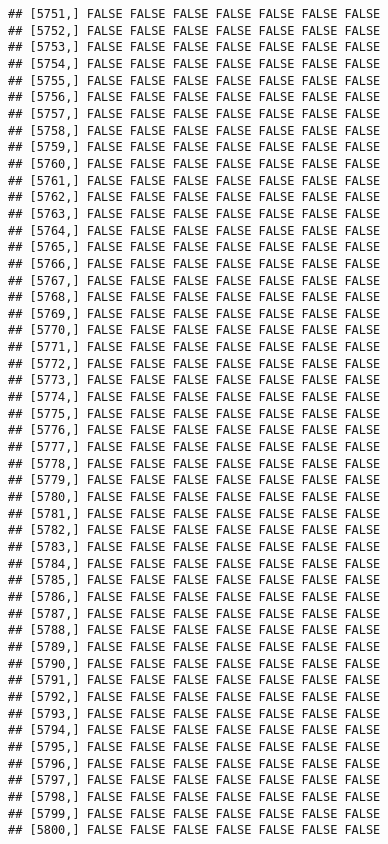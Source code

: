 \documentclass[
]{article}
\begin{document}
\begin{verbatim}
## [5751,] FALSE FALSE FALSE FALSE FALSE FALSE FALSE
## [5752,] FALSE FALSE FALSE FALSE FALSE FALSE FALSE
## [5753,] FALSE FALSE FALSE FALSE FALSE FALSE FALSE
## [5754,] FALSE FALSE FALSE FALSE FALSE FALSE FALSE
## [5755,] FALSE FALSE FALSE FALSE FALSE FALSE FALSE
## [5756,] FALSE FALSE FALSE FALSE FALSE FALSE FALSE
## [5757,] FALSE FALSE FALSE FALSE FALSE FALSE FALSE
## [5758,] FALSE FALSE FALSE FALSE FALSE FALSE FALSE
## [5759,] FALSE FALSE FALSE FALSE FALSE FALSE FALSE
## [5760,] FALSE FALSE FALSE FALSE FALSE FALSE FALSE
## [5761,] FALSE FALSE FALSE FALSE FALSE FALSE FALSE
## [5762,] FALSE FALSE FALSE FALSE FALSE FALSE FALSE
## [5763,] FALSE FALSE FALSE FALSE FALSE FALSE FALSE
## [5764,] FALSE FALSE FALSE FALSE FALSE FALSE FALSE
## [5765,] FALSE FALSE FALSE FALSE FALSE FALSE FALSE
## [5766,] FALSE FALSE FALSE FALSE FALSE FALSE FALSE
## [5767,] FALSE FALSE FALSE FALSE FALSE FALSE FALSE
## [5768,] FALSE FALSE FALSE FALSE FALSE FALSE FALSE
## [5769,] FALSE FALSE FALSE FALSE FALSE FALSE FALSE
## [5770,] FALSE FALSE FALSE FALSE FALSE FALSE FALSE
## [5771,] FALSE FALSE FALSE FALSE FALSE FALSE FALSE
## [5772,] FALSE FALSE FALSE FALSE FALSE FALSE FALSE
## [5773,] FALSE FALSE FALSE FALSE FALSE FALSE FALSE
## [5774,] FALSE FALSE FALSE FALSE FALSE FALSE FALSE
## [5775,] FALSE FALSE FALSE FALSE FALSE FALSE FALSE
## [5776,] FALSE FALSE FALSE FALSE FALSE FALSE FALSE
## [5777,] FALSE FALSE FALSE FALSE FALSE FALSE FALSE
## [5778,] FALSE FALSE FALSE FALSE FALSE FALSE FALSE
## [5779,] FALSE FALSE FALSE FALSE FALSE FALSE FALSE
## [5780,] FALSE FALSE FALSE FALSE FALSE FALSE FALSE
## [5781,] FALSE FALSE FALSE FALSE FALSE FALSE FALSE
## [5782,] FALSE FALSE FALSE FALSE FALSE FALSE FALSE
## [5783,] FALSE FALSE FALSE FALSE FALSE FALSE FALSE
## [5784,] FALSE FALSE FALSE FALSE FALSE FALSE FALSE
## [5785,] FALSE FALSE FALSE FALSE FALSE FALSE FALSE
## [5786,] FALSE FALSE FALSE FALSE FALSE FALSE FALSE
## [5787,] FALSE FALSE FALSE FALSE FALSE FALSE FALSE
## [5788,] FALSE FALSE FALSE FALSE FALSE FALSE FALSE
## [5789,] FALSE FALSE FALSE FALSE FALSE FALSE FALSE
## [5790,] FALSE FALSE FALSE FALSE FALSE FALSE FALSE
## [5791,] FALSE FALSE FALSE FALSE FALSE FALSE FALSE
## [5792,] FALSE FALSE FALSE FALSE FALSE FALSE FALSE
## [5793,] FALSE FALSE FALSE FALSE FALSE FALSE FALSE
## [5794,] FALSE FALSE FALSE FALSE FALSE FALSE FALSE
## [5795,] FALSE FALSE FALSE FALSE FALSE FALSE FALSE
## [5796,] FALSE FALSE FALSE FALSE FALSE FALSE FALSE
## [5797,] FALSE FALSE FALSE FALSE FALSE FALSE FALSE
## [5798,] FALSE FALSE FALSE FALSE FALSE FALSE FALSE
## [5799,] FALSE FALSE FALSE FALSE FALSE FALSE FALSE
## [5800,] FALSE FALSE FALSE FALSE FALSE FALSE FALSE

\end{verbatim}
\end{document}
